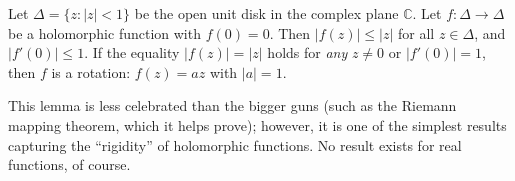 \documentclass[12pt]{article}
\newcommand{\Complex}{\mathbb{C}}
\newcommand{\size}[1]{| #1 |}
\begin{document}
Let $\Delta = \{z: \size{z} < 1\}$ be the open unit disk in the complex plane $\Complex$.  Let $f\colon\Delta\to\Delta$ be a holomorphic function with $f(0)=0$.  
Then $\size{f(z)} \le \size{z}$ for all $z\in\Delta$, and $\size{f'(0)} \le 1$.  If the equality $\size{f(z)}=\size{z}$ holds for \emph{any} $z\ne 0$ or $\size{f'(0)}=1$, then $f$ is a rotation: $f(z)=az$ with $\size{a}=1$.

This lemma is less celebrated than the bigger guns (such as the Riemann mapping theorem, which it helps prove); however, it is one of the simplest results capturing the ``rigidity'' of holomorphic functions.  No  result exists for real functions, of course.
\end{document}
